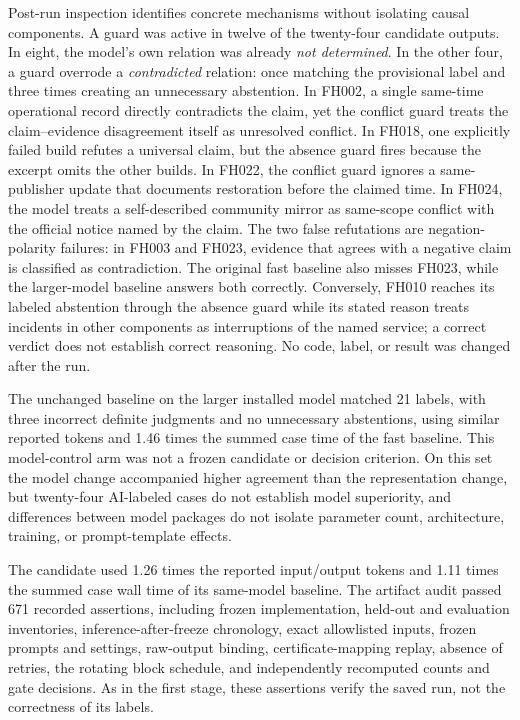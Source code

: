 Post-run inspection identifies concrete mechanisms without isolating causal components. A guard was active in twelve of the twenty-four candidate outputs. In eight, the model's own relation was already \emph{not determined}. In the other four, a guard overrode a \emph{contradicted} relation: once matching the provisional label and three times creating an unnecessary abstention. In FH002, a single same-time operational record directly contradicts the claim, yet the conflict guard treats the claim--evidence disagreement itself as unresolved conflict. In FH018, one explicitly failed build refutes a universal claim, but the absence guard fires because the excerpt omits the other builds. In FH022, the conflict guard ignores a same-publisher update that documents restoration before the claimed time. In FH024, the model treats a self-described community mirror as same-scope conflict with the official notice named by the claim. The two false refutations are negation-polarity failures: in FH003 and FH023, evidence that agrees with a negative claim is classified as contradiction. The original fast baseline also misses FH023, while the larger-model baseline answers both correctly. Conversely, FH010 reaches its labeled abstention through the absence guard while its stated reason treats incidents in other components as interruptions of the named service; a correct verdict does not establish correct reasoning. No code, label, or result was changed after the run.

The unchanged baseline on the larger installed model matched 21 labels, with three incorrect definite judgments and no unnecessary abstentions, using similar reported tokens and 1.46 times the summed case time of the fast baseline. This model-control arm was not a frozen candidate or decision criterion. On this set the model change accompanied higher agreement than the representation change, but twenty-four AI-labeled cases do not establish model superiority, and differences between model packages do not isolate parameter count, architecture, training, or prompt-template effects.

The candidate used 1.26 times the reported input/output tokens and 1.11 times the summed case wall time of its same-model baseline. The artifact audit passed 671 recorded assertions, including frozen implementation, held-out and evaluation inventories, inference-after-freeze chronology, exact allowlisted inputs, frozen prompts and settings, raw-output binding, certificate-mapping replay, absence of retries, the rotating block schedule, and independently recomputed counts and gate decisions. As in the first stage, these assertions verify the saved run, not the correctness of its labels.

